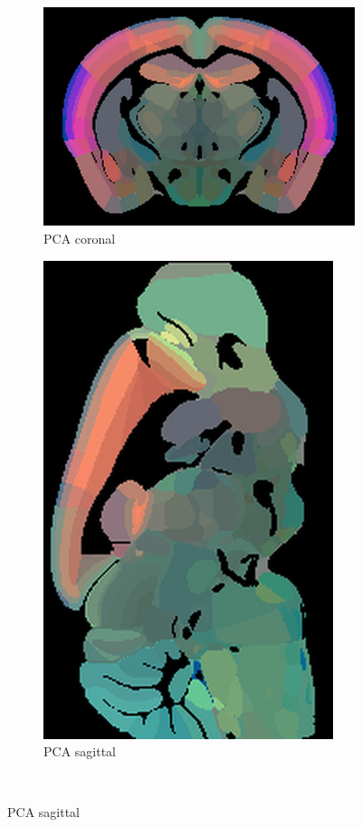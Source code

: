 \documentclass[]{article}
\begin{document}
\begin{figure}
	\begin{subfigure}{.43\textwidth}
		\centering
		\includegraphics[width=.9\linewidth]{../results/pca_ano_coronal_50_res_slice_1.png}
		\caption{PCA coronal}
		\label{fig:PCA_cor}
	\end{subfigure}
	\begin{subfigure}{.3\textwidth}
		\centering
		\includegraphics[width=.9\linewidth, angle=270]{../results/pca_ano_sagittal_50_res_slice_1.png}
		\caption{PCA sagittal}
		\label{fig:PCA_sag}
	\end{subfigure}\\


\end{figure}
\end{document}

